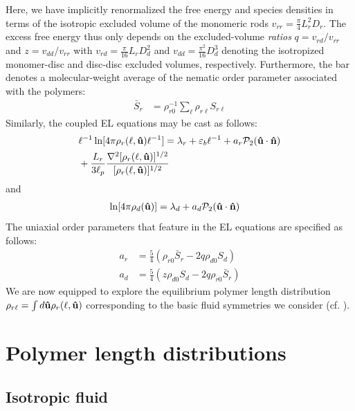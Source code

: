  Here, we have implicitly renormalized the free energy and species densities in terms of the isotropic excluded volume of the monomeric rods  $v_{rr} = \frac{\pi}{4} L_{r}^{2} D_{r}$. The excess free energy thus only depends on the excluded-volume {\em ratios}    $q= v_{rd}/v_{rr}$ and $z =v_{dd}/v_{rr}$  with $v_{rd} = \frac{\pi}{16} L_{r} D_{d}^{2} $ and $v_{dd} = \frac{\pi^{2}}{16} D_{d}^{3}$ denoting the isotropized  monomer-disc and disc-disc excluded volumes, respectively.
Furthermore, the bar denotes a molecular-weight average of the nematic order parameter associated with the polymers:
\begin{align}
\bar{S}_{r} &= \rho_{r0}^{-1}  \sum_{\ell} \rho_{r\ell} S_{r \ell} 
\label{srav}
\end{align}
Similarly, the coupled EL equations may be cast as follows: 
\begin{align}
& \ell^{-1} \ln [ 4 \pi \rho_{r} (\ell, {\bf \hat{u}} ) \ell^{-1} ]   = \lambda_{r}  + \varepsilon_{b} \ell^{-1} +  a_{r} {\mathcal P}_{2}({\bf \hat{u}} \cdot {\bf \hat{n}}) \nonumber \\ 
&  +\frac{L_{r}}{3\ell_{p}} \frac{\nabla^{2} [ \rho_{r} (\ell , {\bf \hat{u}})]^{1/2}}{ [ \rho_{r} (\ell , {\bf \hat{u}})]^{1/2} }
\label{lnrhor}
\end{align}
and
\begin{align}
\ln [ 4 \pi  \rho_{d} ({\bf \hat{u}} )] & = \lambda_{d}  + a_{d} {\mathcal P}_{2}({\bf \hat{u}} \cdot {\bf \hat{n}})  
\label{lnd}
\end{align}
The uniaxial order parameters that feature in the EL equations are specified as follows:
\begin{align}
a_{r} &=    \frac{5 }{4}  ( \rho_{r0}  \bar{S}_{r} -   2  q\rho_{d0}  S_{d} )  \nonumber \\
a_{d} &=   \frac{5}{4} (  z \rho_{d0}   S_{d}  -  2q  \rho_{r0} \bar{S}_{r} )  
\label{alphabeta}
\end{align}
We  are now equipped to explore the equilibrium polymer length distribution  $\rho_{r \ell} =  \int d {\bf \hat{u}} \rho_{r} (\ell, {\bf \hat{u}})$ corresponding to the basic fluid symmetries we consider (cf. ).

\section{Polymer length distributions}

\subsection{Isotropic fluid}

